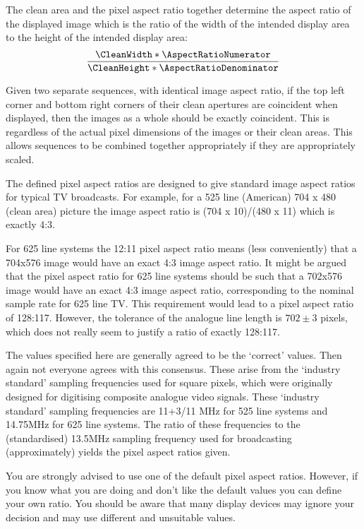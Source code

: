 \begin{informative*}
The clean area and the pixel aspect ratio together determine the
aspect ratio of the displayed image which is the ratio of the width of the intended
display area to the height of the intended display area:
\[\dfrac{\CleanWidth*\AspectRatioNumerator}{\CleanHeight*\AspectRatioDenominator}\]

Given two separate sequences, with identical image aspect ratio, if the
top left corner and bottom right corners of their clean apertures are
coincident when displayed, then the images as a whole should be exactly
coincident. This is regardless of the actual pixel dimensions of the
images or their clean areas. This allows sequences to be combined
together appropriately if they are appropriately scaled.

The defined pixel aspect ratios are designed to give standard image
aspect ratios for typical TV broadcasts. For example, for a 525 line
(American) 704 x 480 (clean area)  picture the image aspect ratio is
(704 x 10)/(480 x 11) which is exactly 4:3.

For 625 line systems the 12:11 pixel aspect ratio means (less
conveniently) that a 704x576 image would have an exact 4:3 image
aspect ratio. It might be argued that the pixel aspect ratio for 625
line systems should be such that a 702x576 image would have an exact 4:3
image aspect ratio, corresponding to the nominal sample rate for 625 line TV.
This requirement would lead to a
pixel aspect ratio of 128:117. However, the tolerance of the analogue
line length is $702\pm 3$ pixels, which does not really seem to justify a
ratio of exactly 128:117.

The values specified here are generally agreed to be the
`correct' values. Then again not everyone agrees with this
consensus. These arise from the `industry standard' sampling
frequencies used for square pixels, which were originally designed for
digitising composite analogue video signals. These `industry
standard' sampling frequencies are 11+3/11 MHz for 525 line systems
and 14.75MHz for 625 line systems. The ratio of these frequencies to the
(standardised) 13.5MHz sampling frequency used for broadcasting (approximately) 
yields the pixel aspect ratios given.

You are strongly advised to use one of the default pixel aspect ratios.
However, if you know what you are doing and don't like the default
values you can define your own ratio. You should be aware that many
display devices may ignore your decision and may use different and
unsuitable values. 

\end{informative*}

